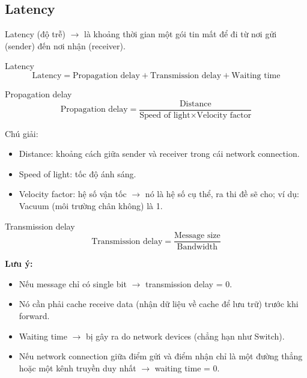 
\subsection{Latency}

\noindent
Latency (độ trễ) $\rightarrow$ là khoảng thời gian một gói tin mất để đi từ nơi gửi (sender) đến nơi nhận (receiver).
\medskip

\begin{mybox}{Latency}
\begin{equation*}
    \text{Latency} = \text{Propagation delay} + \text{Transmission delay} + \text{Waiting time}
\end{equation*}
\end{mybox}
\medskip

\begin{mybox}{Propagation delay}
\begin{equation*}
    \text{Propagation delay} = \frac{\text{Distance}}{\text{Speed of light} \times \text{Velocity factor}}
\end{equation*}
\end{mybox}

\noindent
Chú giải:

\begin{itemize}
    \item Distance: khoảng cách giữa sender và receiver trong cái network connection.
    \item Speed of light: tốc độ ánh sáng.
    \item Velocity factor: hệ số vận tốc $\rightarrow$ nó là hệ số cụ thể, ra thi đề sẽ cho; ví dụ: Vacuum (môi trường chân không) là 1.
\end{itemize}

\begin{mybox}{Transmission delay}
\begin{equation*}
    \text{Transmission delay} = \frac{\text{Message size}}{\text{Bandwidth}}
\end{equation*}
\end{mybox}
\medskip

\noindent
\textbf{Lưu ý:}

\begin{itemize}
    \item Nếu message chỉ có single bit $\rightarrow$ transmission delay = 0.
    \item Nó cần phải cache receive data (nhận dữ liệu về cache để lưu trữ) trước khi forward.
    \item Waiting time $\rightarrow$ bị gây ra do network devices (chẳng hạn như Switch).
    \item Nếu network connection giữa điểm gửi và điểm nhận chỉ là một đường thẳng hoặc một kênh truyền duy nhất $\rightarrow$ waiting time = 0.
\end{itemize}
\medskip


